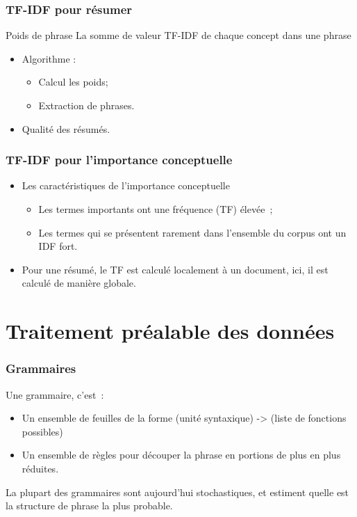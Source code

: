 \documentclass[12pt, handout]{beamer}
\begin{document}
\begin{frame}
 \frametitle{TF-IDF pour résumer}
  \begin{block}{Poids de phrase}
 	La somme de valeur TF-IDF de chaque concept dans une phrase
 \end{block}
 \begin{itemize}
  \item Algorithme :
  	\begin{itemize}
  	\item Calcul les poids;
  	\item Extraction de phrases.
  	\end{itemize}
  \item Qualité des résumés.
 \end{itemize}
 
\end{frame}

\begin{frame}
 \frametitle{TF-IDF pour l'importance conceptuelle}
 \begin{itemize}
  	\item Les caractéristiques de l'importance conceptuelle
  	\begin{itemize}
  		\item Les termes importants ont une fréquence (TF) élevée~;
 		\item Les termes qui se présentent rarement dans l'ensemble du corpus ont un IDF fort.
  	\end{itemize}
  	\item Pour une résumé, le TF est calculé localement à un document, ici, il est calculé de manière globale.
  \end{itemize}
 
\end{frame}

\section{Traitement préalable des données}



\begin{frame}
 \frametitle{Grammaires}
 Une grammaire, c'est~:
 \begin{itemize}
  \item Un ensemble de feuilles de la forme (unité syntaxique) -> (liste de fonctions possibles)
  \item Un ensemble de règles pour découper la phrase en portions de plus en plus réduites.
 \end{itemize}
 La plupart des grammaires sont aujourd'hui stochastiques, et estiment quelle est la structure de phrase la plus probable.
 
\end{frame}
\end{document}
